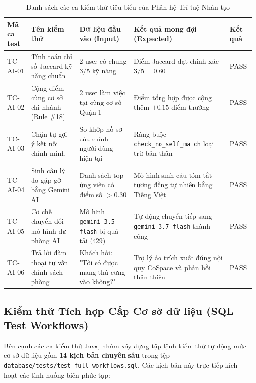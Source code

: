 \begin{table}[H]
\centering
\caption{Danh sách các ca kiểm thử tiêu biểu của Phân hệ Trí tuệ Nhân tạo}
\label{tab:tc-ai}
\renewcommand{\arraystretch}{1.25}
\begin{tabular}{|p{2.2cm}|p{3.5cm}|p{3.5cm}|p{4.2cm}|p{1.2cm}|}
\hline
\textbf{Mã ca test} & \textbf{Tên kiểm thử} & \textbf{Dữ liệu đầu vào (Input)} & \textbf{Kết quả mong đợi (Expected)} & \textbf{Kết quả} \\
\hline
TC-AI-01 & Tính toán chỉ số Jaccard kỹ năng chuẩn & 2 user có chung 3/5 kỹ năng & Điểm Jaccard đạt chính xác $3/5 = 0.60$ & PASS \\
\hline
TC-AI-02 & Cộng điểm cùng cơ sở chi nhánh (Rule \#18) & 2 user làm việc tại cùng cơ sở Quận 1 & Điểm tổng hợp được cộng thêm $+0.15$ điểm thưởng & PASS \\
\hline
TC-AI-03 & Chặn tự gợi ý kết nối chính mình & So khớp hồ sơ của chính người dùng hiện tại & Ràng buộc \texttt{check\_no\_self\_match} loại trừ bản thân & PASS \\
\hline
TC-AI-04 & Sinh câu lý do gặp gỡ bằng Gemini AI & Danh sách top ứng viên có điểm số $> 0.30$ & Mô hình sinh câu tóm tắt tương đồng tự nhiên bằng Tiếng Việt & PASS \\
\hline
TC-AI-05 & Cơ chế chuyển đổi mô hình dự phòng AI & Mô hình \texttt{gemini-3.5-flash} bị quá tải (429) & Tự động chuyển tiếp sang \texttt{gemini-3.7-flash} thành công & PASS \\
\hline
TC-AI-06 & Trả lời đàm thoại tư vấn chính sách phòng & Khách hỏi: "Tôi có được mang thú cưng vào không?" & Trợ lý ảo trích xuất đúng nội quy CoSpace và phản hồi thân thiện & PASS \\
\hline
\end{tabular}
\end{table}

\subsection{Kiểm thử Tích hợp Cấp Cơ sở dữ liệu (SQL Test Workflows)}

Bên cạnh các ca kiểm thử Java, nhóm xây dựng tập lệnh kiểm thử tự động mức cơ sở dữ liệu gồm \textbf{14 kịch bản chuyên sâu} trong tệp \texttt{database/tests/test\_full\_workflows.sql}. Các kịch bản này trực tiếp kích hoạt các tình huống biên phức tạp:

